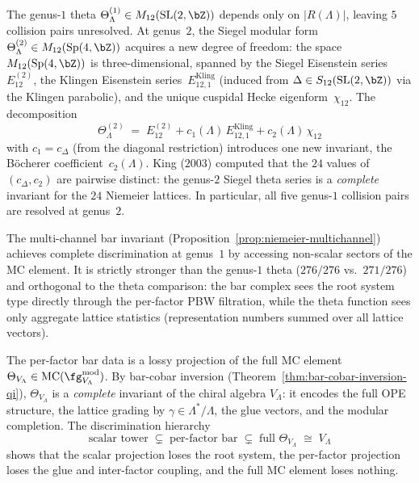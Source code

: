 \begin{remark}
\label{rem:genus2-theta-niemeier}
The genus-$1$ theta $\Theta_\Lambda^{(1)} \in M_{12}(\mathrm{SL}(2,\bZ))$
depends only on $|R(\Lambda)|$, leaving $5$ collision pairs
unresolved.
At genus~$2$, the Siegel modular form
$\Theta_\Lambda^{(2)} \in M_{12}(\mathrm{Sp}(4,\bZ))$
acquires a new degree of freedom: the space
$M_{12}(\mathrm{Sp}(4,\bZ))$ is three-dimensional,
spanned by the Siegel Eisenstein series~$E_{12}^{(2)}$,
the Klingen Eisenstein series~$E_{12,1}^{\mathrm{Kling}}$
\textup{(}induced from $\Delta \in S_{12}(\mathrm{SL}(2,\bZ))$
via the Klingen parabolic\textup{)},
and the unique cuspidal Hecke eigenform~$\chi_{12}$.
The decomposition
\[
 \Theta_\Lambda^{(2)}
 \;=\;
 E_{12}^{(2)}
 + c_1(\Lambda)\, E_{12,1}^{\mathrm{Kling}}
 + c_2(\Lambda)\, \chi_{12}
\]
with $c_1 = c_\Delta$ (from the diagonal restriction)
introduces one new invariant, the B\"ocherer
coefficient~$c_2(\Lambda)$.
King \textup{(}$2003$\textup{)} computed that the $24$ values
of $(c_\Delta, c_2)$ are pairwise
distinct:
the genus-$2$ Siegel theta series
is a \emph{complete} invariant for the
$24$ Niemeier lattices.
In particular, all five genus-$1$ collision pairs are resolved
at genus~$2$.

The multi-channel bar invariant
\textup{(}Proposition~\textup{\ref{prop:niemeier-multichannel}}\textup{)}
achieves complete discrimination at genus~$1$ by accessing
non-scalar sectors of the MC element.
It is strictly stronger than the genus-$1$ theta
\textup{(}$276/276$ vs.\ $271/276$\textup{)}
and orthogonal to the theta comparison:
the bar complex sees the root system type directly
through the per-factor PBW filtration,
while the theta function sees only aggregate lattice
statistics
\textup{(}representation numbers summed over all lattice
vectors\textup{)}.
\end{remark}

\begin{remark}
\label{rem:mc-complete-niemeier}
The per-factor bar data is a lossy projection
of the full MC element $\Theta_{V_\Lambda}
\in \mathrm{MC}(\fg^{\mathrm{mod}}_{V_\Lambda})$.
By bar-cobar inversion
\textup{(}Theorem~\textup{\ref{thm:bar-cobar-inversion-qi}}\textup{)},
$\Theta_{V_\Lambda}$ is a \emph{complete} invariant
of the chiral algebra $V_\Lambda$: it encodes the full
OPE structure, the lattice grading by
$\gamma \in \Lambda^*/\Lambda$, the glue vectors,
and the modular completion.
The discrimination hierarchy
\[
 \text{scalar tower}
 \;\subsetneq\;
 \text{per-factor bar}
 \;\subsetneq\;
 \text{full } \Theta_{V_\Lambda}
 \;\cong\;
 V_\Lambda
\]
shows that the scalar projection loses the root system,
the per-factor projection loses the glue and inter-factor
coupling, and the full MC element loses nothing.
\end{remark}

